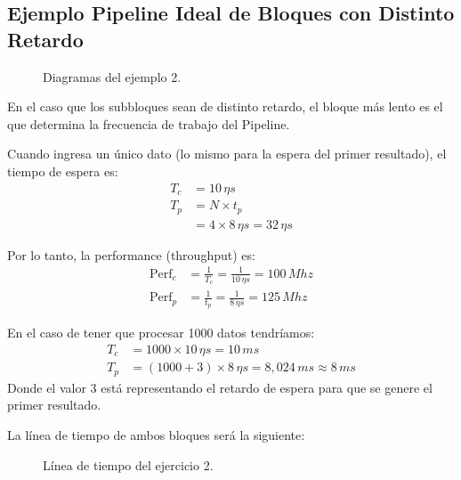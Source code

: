 \documentclass[a4paper, 11pt]{article}
\begin{document}
\newpage
\subsection*{Ejemplo Pipeline Ideal de Bloques con Distinto Retardo}


\begin{figure}[h]
  \centering
  \caption{Diagramas del ejemplo 2.}
\end{figure}

En el caso que los subbloques sean de distinto retardo, el bloque más
lento es el que determina la frecuencia de trabajo del Pipeline.

Cuando ingresa un único dato (lo mismo para la espera del primer
resultado), el tiempo de espera es:
\begin{align*}
  T_c &= 10\,\eta s \\
  T_p &= N \times t_p \\
      &= 4 \times 8\,\eta s = 32\,\eta s
\end{align*}

Por lo tanto, la performance (throughput) es:
\begin{align*}
  \text{Perf}_c &= \frac{1}{T_c} = \frac{1}{10\,\eta s} = 100\,Mhz \\
  \text{Perf}_p &= \frac{1}{t_p} = \frac{1}{8\,\eta s} = 125\,Mhz
\end{align*}


En el caso de tener que procesar 1000 datos tendríamos:
\begin{align*}
  T_c &= 1000 \times 10\,\eta s = 10\,ms \\
  T_p &= (1000 + 3) \times 8\,\eta s = 8,024\,m s \approx 8\,ms
\end{align*}
Donde el valor 3 está representando el retardo de espera para que se
genere el primer resultado.

La línea de tiempo de ambos bloques será la siguiente:
 
\begin{figure}[h]
  \centering
  
  \caption{Línea de tiempo del ejercicio 2.}
\end{figure}
\end{document}
